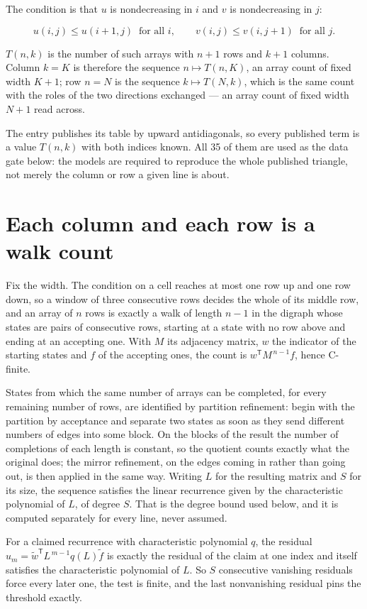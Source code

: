 \documentclass[11pt]{article}
\theoremstyle{definition}
\begin{document}
The condition is that $u$ is nondecreasing in $i$ and $v$ is nondecreasing in $j$:

\[u(i,j) \le u(i{+}1,j) \ \text{ for all } i, \qquad v(i,j) \le v(i,j{+}1) \ \text{ for all } j.\]

$T(n,k)$ is the number of such arrays with $n + 1$ rows and $k + 1$ columns. Column $k = K$ is therefore the sequence $n \mapsto T(n,K)$, an array count of fixed width $K + 1$; row $n = N$ is the sequence $k \mapsto T(N,k)$, which is the same count with the roles of the two directions exchanged --- an array count of fixed width $N + 1$ read across.

The entry publishes its table by upward antidiagonals, so every published term is a value $T(n,k)$ with both indices known. All 35 of them are used as the data gate below: the models are required to reproduce the whole published triangle, not merely the column or row a given line is about.

\section{Each column and each row is a walk count}

Fix the width. The condition on a cell reaches at most one row up and one row down, so a window of three consecutive rows decides the whole of its middle row, and an array of $n$ rows is exactly a walk of length $n-1$ in the digraph whose states are pairs of consecutive rows, starting at a state with no row above and ending at an accepting one. With $M$ its adjacency matrix, $w$ the indicator of the starting states and $f$ of the accepting ones, the count is $w^{\mathsf T}M^{\,n-1}f$, hence C-finite.

States from which the same number of arrays can be completed, for every remaining number of rows, are identified by partition refinement: begin with the partition by acceptance and separate two states as soon as they send different numbers of edges into some block. On the blocks of the result the number of completions of each length is constant, so the quotient counts exactly what the original does; the mirror refinement, on the edges coming in rather than going out, is then applied in the same way. Writing $L$ for the resulting matrix and $S$ for its size, the sequence satisfies the linear recurrence given by the characteristic polynomial of $L$, of degree $S$. That is the degree bound used below, and it is computed separately for every line, never assumed.

For a claimed recurrence with characteristic polynomial $q$, the residual $u_m = \tilde w^{\mathsf T}L^{\,m-1}q(L)\tilde f$ is exactly the residual of the claim at one index and itself satisfies the characteristic polynomial of $L$. So $S$ consecutive vanishing residuals force every later one, the test is finite, and the last nonvanishing residual pins the threshold exactly.
\end{document}
